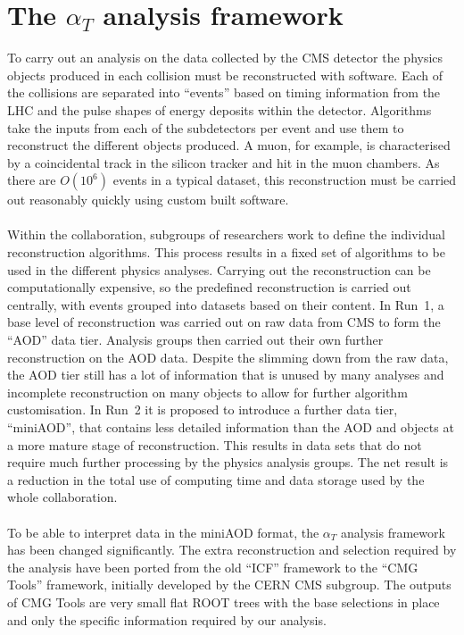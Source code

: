 
\section{The \boldmath $\alpha_T$ analysis framework}
\label{sec:analysisFw}

To carry out an analysis on the data collected by the CMS detector the physics objects produced in each collision must be reconstructed with software. Each of the collisions are separated into ``events'' based on timing information from the LHC and the pulse shapes of energy deposits within the detector. Algorithms take the inputs from each of the subdetectors per event and use them to reconstruct the different objects produced. A muon, for example, is characterised by a coincidental track in the silicon tracker and hit in the muon chambers. As there are $O(10^6)$ events in a typical dataset, this reconstruction must be carried out reasonably quickly using custom built software.
\\\\
Within the collaboration, subgroups of researchers work to define the individual reconstruction algorithms. This process results in a fixed set of algorithms to be used in the different physics analyses. Carrying out the reconstruction can be computationally expensive, so the predefined reconstruction is carried out centrally, with events grouped into datasets based on their content. In Run~1, a base level of reconstruction was carried out on raw data from CMS to form the ``AOD'' data tier. Analysis groups then carried out their own further reconstruction on the AOD data. Despite the slimming down from the raw data, the AOD tier still has a lot of information that is unused by many analyses and incomplete reconstruction on many objects to allow for further algorithm customisation. In Run~2 it is proposed to introduce a further data tier, ``miniAOD'', that contains less detailed information than the AOD and objects at a more mature stage of reconstruction. This results in data sets that do not require much further processing by the physics analysis groups. The net result is a reduction in the total use of computing time and data storage used by the whole collaboration.
\\\\
To be able to interpret data in the miniAOD format, the $\alpha_T$ analysis framework has been changed significantly. The extra reconstruction and selection required by the analysis have been ported from the old ``ICF'' framework to the ``CMG Tools'' framework, initially developed by the CERN CMS subgroup. The outputs of CMG Tools are very small flat ROOT trees with the base selections in place and only the specific information required by our analysis.

